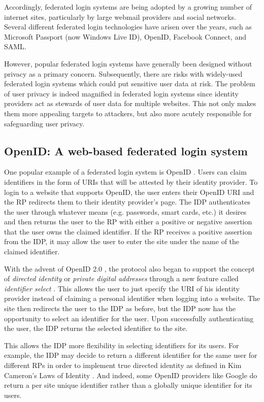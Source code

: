 \documentclass{llncs}
\begin{document}
Accordingly, federated login systems are being adopted by a growing
number of internet sites, particularly by large webmail providers and
social networks.  Several different federated login technologies have
arisen over the years, such as Microsoft Passport (now Windows Live
ID), OpenID, Facebook Connect, and SAML.


However, popular federated login systems have generally been designed
without privacy as a primary concern. Subsequently, there are risks
with widely-used federated login systems which could put sensitive
user data at risk. The problem of user privacy is indeed magnified in
federated login systems since identity providers act as stewards of
user data for multiple websites. This not only makes them more
appealing targets to attackers, but also more acutely responsible for
safeguarding user privacy.


\subsection{OpenID: A web-based federated login system}

One popular example of a federated login system is OpenID
\cite{OID}. Users can claim identifiers in the form of URIs that will
be attested by their identity provider. To login to a website that
supports OpenID, the user enters their OpenID URI and the RP redirects
them to their identity provider's page. The IDP authenticates the user
through whatever means (e.g. passwords, smart cards, etc.) it desires
and then returns the user to the RP with either a positive or negative
assertion that the user owns the claimed identifier. If the RP
receives a positive assertion from the IDP, it may allow the user to
enter the site under the name of the claimed identifier.

With the advent of OpenID 2.0 \cite{OID2}, the protocol also began to support
the concept of \emph{directed identity} \cite{Cam06} or \emph{private digital
addresses} through a new feature called \emph{identifier select} \cite{RR06}.
This allows the user to just specify the URI of his identity provider instead
of claiming a personal identifier when logging into a website. The site then
redirects the user to the IDP as before, but the IDP now has the opportunity to
select an identifier for the user. Upon successfully authenticating the user,
the IDP returns the selected identifier to the site.

This allows the IDP more flexibility in selecting identifiers for its users. For
example, the IDP may decide to return a different identifier for the same user
for different RPs in order to implement true directed identity as defined in Kim
Cameron's Laws of Identity \cite{Cam06}. And indeed, some OpenID providers like
Google do return a per site unique identifier rather than a globally unique
identifier for its users.
\end{document}
